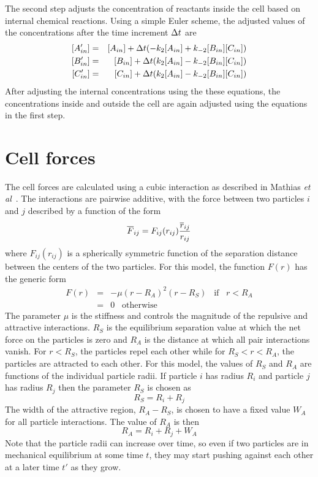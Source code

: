 \documentclass[12pt]{article}
\begin{document}
The second step adjusts the concentration of reactants inside the cell based on
internal chemical reactions. Using a simple Euler scheme, the adjusted values of
the concentrations after the time increment $\Delta t$ are
\begin{eqnarray}
\nonumber
[A'_{in}] &=& [A_{in}] + \Delta t(-k_2 [A_{in}] + k_{-2} [B_{in}][C_{in}]) \\
\nonumber
[B'_{in}] &=& [B_{in}] + \Delta t(k_2 [A_{in}] - k_{-2} [B_{in}][C_{in}]) \\
\nonumber
[C'_{in}] &=& [C_{in}] + \Delta t(k_2 [A_{in}] - k_{-2} [B_{in}][C_{in}])
\end{eqnarray}
After adjusting the internal concentrations using the these equations, the
concentrations inside and outside the cell are again adjusted using the
equations in the first step.

\section{Cell forces}
The cell forces are calculated using a cubic interaction as described in Mathias
{\em et al}~\cite{Mathias}. The interactions are pairwise
additive, with the force between two particles $i$ and $j$ described by a function of the form
\[
\overline{F}_{ij} = F_{ij}(r_{ij})\frac{\overline{r}_{ij}}{r_{ij}}
\]
where $F_{ij}(r_{ij})$ is a spherically symmetric function of the separation distance between the
centers of the two particles. For this model, the function $F(r)$ has the generic form
\begin{eqnarray*}
F(r) &=& -\mu(r-R_A)^2(r-R_S)\;\;\;\mbox{if}\;\;\;r<R_A \\
& = & 0\;\;\; \mbox{otherwise}
\end{eqnarray*}
The parameter $\mu$ is the stiffness and controls the magnitude of the repulsive and attractive
interactions. $R_S$ is the equilibrium separation value at which the net force on the particles is zero
and $R_A$ is the distance at which all pair interactions vanish. For $r<R_S$, the particles repel each
other while for $R_S<r<R_A$, the particles are attracted to each other. For this model, the values of
$R_S$ and $R_A$ are functions of the individual particle radii. If particle $i$ has radius $R_i$ and
particle $j$ has radius $R_j$ then the parameter $R_S$ is chosen as
\[
R_S = R_i+R_j
\]
The width of the attractive region, $R_A-R_S$, is chosen to have a fixed value $W_A$ for all particle
interactions. The value of $R_A$ is then
\[
R_A = R_i+R_j +W_A
\]
Note that the particle radii can increase over time, so even if two particles are in mechanical
equilibrium at some time $t$, they may start pushing against each other at a later time $t'$ as they
grow.
\end{document}
